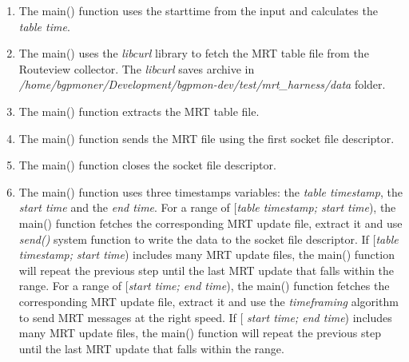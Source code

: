 \begin{enumerate}
\begin{enumerate}
\item{The main() function uses the starttime from the input and  calculates the \emph{table time}. }

\item{The main() uses the \emph{libcurl} library to fetch the MRT table file from the Routeview collector.  The \emph{libcurl} saves archive in \emph{/home/bgpmoner/Development/bgpmon-dev/test/mrt\_harness/data} folder. }

\item{The main() function extracts the MRT table file. }
\item{The main() function sends the MRT file using the first socket file descriptor.}
\item{The main() function closes the socket file descriptor.}

\item{The main() function uses three timestamps variables: the \emph{table timestamp}, the \emph{start time} and the \emph{end time}.  For a range of [\emph{table timestamp; start time}), the main() function fetches the corresponding  MRT update file, extract it and use \emph{send()} system function to write the data to the socket file descriptor. If [\emph{table timestamp; start time}) includes many MRT update files, the main() function will repeat the previous step until the last MRT update that falls within the range. For a range of [\emph{start time; end time}), the main() function fetches the  corresponding MRT update file, extract it and use the \emph{timeframing} algorithm to send MRT messages at the right speed.  If [\emph{ start time; end time}) includes many MRT update files, the main() function will repeat the previous step until the last MRT update that falls within the range. }






\end{enumerate}
\end{enumerate}
